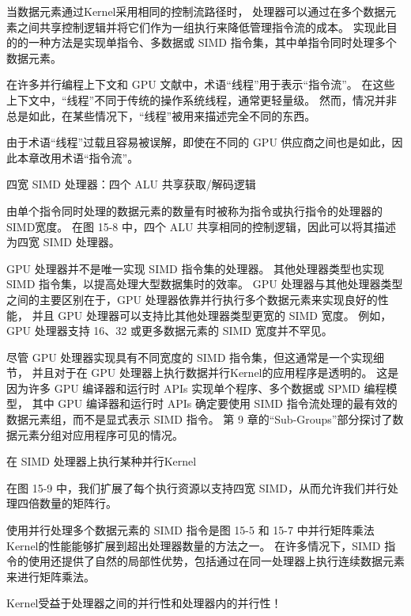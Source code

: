当数据元素通过Kernel采用相同的控制流路径时，
处理器可以通过在多个数据元素之间共享控制逻辑并将它们作为一组执行来降低管理指令流的成本。 
实现此目的的一种方法是实现单指令、多数据或 SIMD 指令集，其中单指令同时处理多个数据元素。

\begin{remark}[线程 VS.指令流]
在许多并行编程上下文和 GPU 文献中，术语“线程”用于表示“指令流”。
在这些上下文中，“线程”不同于传统的操作系统线程，通常更轻量级。
然而，情况并非总是如此，在某些情况下，“线程”被用来描述完全不同的东西。

由于术语“线程”过载且容易被误解，即使在不同的 GPU 供应商之间也是如此，因此本章改用术语“指令流”。
\end{remark}

{\color{red} 四宽 SIMD 处理器：四个 ALU 共享获取/解码逻辑}

由单个指令同时处理的数据元素的数量有时被称为指令或执行指令的处理器的SIMD宽度。 
在图 15-8 中，四个 ALU 共享相同的控制逻辑，因此可以将其描述为四宽 SIMD 处理器。

GPU 处理器并不是唯一实现 SIMD 指令集的处理器。 
其他处理器类型也实现 SIMD 指令集，以提高处理大型数据集时的效率。 
GPU 处理器与其他处理器类型之间的主要区别在于，GPU 处理器依靠并行执行多个数据元素来实现良好的性能，
并且 GPU 处理器可以支持比其他处理器类型更宽的 SIMD 宽度。 
例如，GPU 处理器支持 16、32 或更多数据元素的 SIMD 宽度并不罕见。

\begin{remark}
尽管 GPU 处理器实现具有不同宽度的 SIMD 指令集，但这通常是一个实现细节，
并且对于在 GPU 处理器上执行数据并行Kernel的应用程序是透明的。
这是因为许多 GPU 编译器和运行时 APIs 实现单个程序、多个数据或 SPMD 编程模型，
其中 GPU 编译器和运行时 APIs 确定要使用 SIMD 指令流处理的最有效的数据元素组，而不是显式表示 SIMD 指令。
第 9 章的“Sub-Groups”部分探讨了数据元素分组对应用程序可见的情况。
\end{remark}

{\color{red} 在 SIMD 处理器上执行某种并行Kernel}

在图 15-9 中，我们扩展了每个执行资源以支持四宽 SIMD，从而允许我们并行处理四倍数量的矩阵行。

使用并行处理多个数据元素的 SIMD 指令是图 15-5 
和 15-7 中并行矩阵乘法Kernel的性能能够扩展到超出处理器数量的方法之一。 
在许多情况下，SIMD 指令的使用还提供了自然的局部性优势，包括通过在同一处理器上执行连续数据元素来进行矩阵乘法。

\begin{remark}
	Kernel受益于处理器之间的并行性和处理器内的并行性！
\end{remark}

